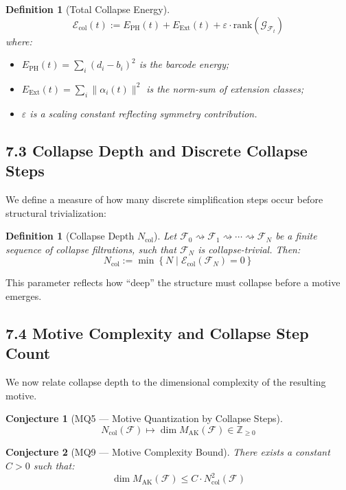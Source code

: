 \documentclass[11pt]{article}
\newtheorem{definition}[theorem]{Definition}
\newtheorem{conjecture}{Conjecture}[section]
\begin{document}
\begin{definition}[Total Collapse Energy]
\[
\mathcal{E}_{\mathrm{col}}(t) := E_{\mathrm{PH}}(t) + E_{\mathrm{Ext}}(t) + \varepsilon \cdot \mathrm{rank}(\mathcal{G}_{\mathcal{F}_t})
\]
where:
\begin{itemize}
    \item $E_{\mathrm{PH}}(t) = \sum_i (d_i - b_i)^2$ is the barcode energy;
    \item $E_{\mathrm{Ext}}(t) = \sum_i \| \alpha_i(t) \|^2$ is the norm-sum of extension classes;
    \item $\varepsilon$ is a scaling constant reflecting symmetry contribution.
\end{itemize}
\end{definition}

\subsection{7.3 Collapse Depth and Discrete Collapse Steps}

We define a measure of how many discrete simplification steps occur before structural trivialization:

\begin{definition}[Collapse Depth $N_{\mathrm{col}}$]
Let $\mathcal{F}_0 \rightsquigarrow \mathcal{F}_1 \rightsquigarrow \cdots \rightsquigarrow \mathcal{F}_N$ be a finite sequence of collapse filtrations, such that $\mathcal{F}_N$ is collapse-trivial. Then:
\[
N_{\mathrm{col}} := \min \left\{ N \mid \mathcal{E}_{\mathrm{col}}(\mathcal{F}_N) = 0 \right\}
\]
\end{definition}

This parameter reflects how “deep” the structure must collapse before a motive emerges.

\subsection{7.4 Motive Complexity and Collapse Step Count}

We now relate collapse depth to the dimensional complexity of the resulting motive.

\begin{conjecture}[MQ5 — Motive Quantization by Collapse Steps]
\[
N_{\mathrm{col}}(\mathcal{F}) \mapsto \dim M_{\mathrm{AK}}(\mathcal{F}) \in \mathbb{Z}_{\geq 0}
\]
\end{conjecture}

\begin{conjecture}[MQ9 — Motive Complexity Bound]
There exists a constant $C > 0$ such that:
\[
\dim M_{\mathrm{AK}}(\mathcal{F}) \leq C \cdot N_{\mathrm{col}}^2(\mathcal{F})
\]
\end{conjecture}
\end{document}

